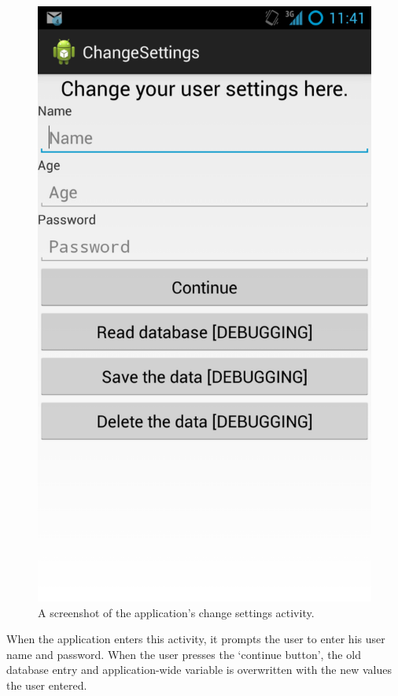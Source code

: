 \begin{figure}
 \centering 
 \includegraphics[clip = true, trim = 0 320 0 60,
 scale=0.2]{change_settings}
 \caption{A screenshot of the application's change settings activity.}
 \label{fig:change-settings-screenshot}
\end{figure}

When the application enters this activity, it prompts the user to enter his user
name and password. When the user presses the `continue button', the old database
entry and application-wide variable is overwritten with the new values the user entered.

